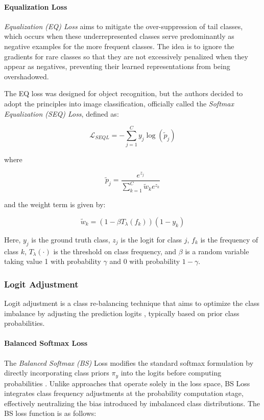 \paragraph{Equalization Loss}
\emph{Equalization (EQ) Loss} \cite{tan2020equalizationlosslongtailedobject} aims to mitigate the over-suppression of tail classes, which occurs when these underrepresented classes serve predominantly as negative examples for the more frequent classes. The idea is to ignore the gradients for rare classes so that they are not excessively penalized when they appear as negatives, preventing their learned representations from being overshadowed. 

The EQ loss was designed for object recognition, but the authors decided to adopt the principles into image classification, officially called the \emph{Softmax Equalization (SEQ) Loss}, defined as: 

\begin{equation}
    \label{eq:EQ_loss}
    \mathcal{L}_{SEQL} = - \sum_{j=1}^{C} y_j \log(\tilde{p}_j)
\end{equation}

where

\begin{equation}
    \tilde{p}_j = \frac{e^{z_j}}{\sum_{k=1}^{C} \tilde{w}_k e^{z_k}}
\end{equation}

and the weight term is given by:

\begin{equation}
    \tilde{w}_k = (1 - \beta T_\lambda(f_k))(1 - y_k)
\end{equation}

Here, $y_j$ is the ground truth class, $z_j$ is the logit for class $j$, $f_k$ is the frequency of class $k$, \(T_\lambda(\cdot)\) is the threshold on class frequency, and \(\beta\) is a random variable taking value 1 with probability \(\gamma\) and 0 with probability \(1 - \gamma\).

\subsubsection{Logit Adjustment}
Logit adjustment is a class re-balancing technique that aims to optimize the class imbalance by adjusting the prediction logits \cite{menon2021longtaillearninglogitadjustment}, typically based on prior class probabilities. 

\paragraph{Balanced Softmax Loss}
The \emph{Balanced Softmax (BS)} Loss modifies the standard softmax formulation by directly incorporating class priors $\pi_y$ into the logits before computing probabilities \cite{ren2020balancedmetasoftmaxlongtailedvisual}. Unlike approaches that operate solely in the loss space, BS Loss integrates class frequency adjustments at the probability computation stage, effectively neutralizing the bias introduced by imbalanced class distributions. The BS loss function is as follows:

